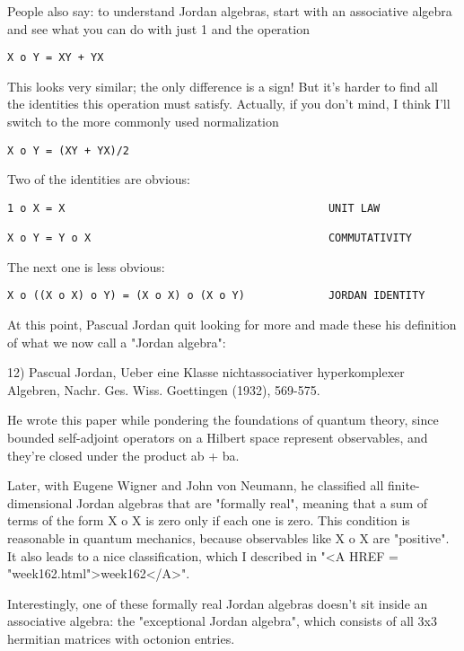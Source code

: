 People also say: to understand Jordan algebras, start with an 
associative algebra and see what you can do with just 1 and the 
operation

\begin{verbatim}
X o Y = XY + YX 
\end{verbatim}
    
This looks very similar; the only difference is a sign!  
But it's
harder to find all the identities this operation must satisfy.
Actually, if you don't mind, I think I'll switch to the more commonly
used normalization
\begin{verbatim}
X o Y = (XY + YX)/2
\end{verbatim}
    

Two of the identities are obvious:

\begin{verbatim}
1 o X = X                                         UNIT LAW

X o Y = Y o X                                     COMMUTATIVITY 
\end{verbatim}
    
The next one is less obvious:

\begin{verbatim}
X o ((X o X) o Y) = (X o X) o (X o Y)             JORDAN IDENTITY
\end{verbatim}
    
At this point, Pascual Jordan quit looking for more and made these 
his definition of what we now call a "Jordan algebra":

12) Pascual Jordan, Ueber eine Klasse nichtassociativer hyperkomplexer 
Algebren, Nachr. Ges. Wiss. Goettingen (1932), 569-575.   

He wrote this paper while pondering the foundations of quantum theory,
since bounded self-adjoint operators on a Hilbert space represent
observables, and they're closed under the product ab + ba.

Later, with Eugene Wigner and John von Neumann, he classified all
finite-dimensional Jordan algebras that are "formally real", meaning
that a sum of terms of the form X o X is zero only if each one is zero.
This condition is reasonable in quantum mechanics, because observables
like X o X are "positive".  It also leads to a nice classification,
which I described in "<A HREF = "week162.html">week162</A>".

Interestingly, one of these formally real Jordan algebras doesn't
sit inside an associative algebra: the "exceptional Jordan algebra", 
which consists of all 3x3 hermitian matrices with octonion entries.

